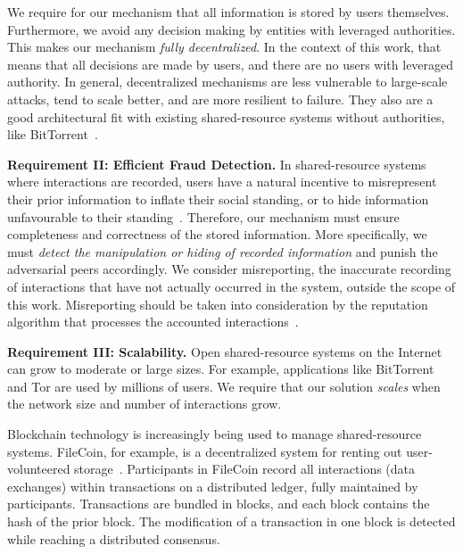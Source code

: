We require for our mechanism that all information is stored by users themselves.
Furthermore, we avoid any decision making by entities with leveraged authorities.
This makes our mechanism \emph{fully decentralized}.
In the context of this work, that means that all decisions are made by users, and there are no users with leveraged authority.
In general, decentralized mechanisms are less vulnerable to large-scale attacks, tend to scale better, and are more resilient to failure.
They also are a good architectural fit with existing shared-resource systems without authorities, like BitTorrent~\cite{cohen2008bittorrent}.

\textbf{Requirement II: Efficient Fraud Detection.}
In shared-resource systems where interactions are recorded, users have a natural incentive to misrepresent their prior information to inflate their social standing, or to hide information unfavourable to their standing~\cite{meulpolder2009bartercast}.
Therefore, our mechanism must ensure completeness and correctness of the stored information.
More specifically, we must \emph{detect the manipulation or hiding of recorded information} and punish the adversarial peers accordingly.
We consider misreporting, the inaccurate recording of interactions that have not actually occurred in the system, outside the scope of this work.
Misreporting should be taken into consideration by the reputation algorithm that processes the accounted interactions~\cite{seuken2010accounting}.


\textbf{Requirement III: Scalability.}
Open shared-resource systems on the Internet can grow to moderate or large sizes.
For example, applications like BitTorrent and Tor are used by millions of users.
We require that our solution \emph{scales} when the network size and number of interactions grow.

Blockchain technology is increasingly being used to manage shared-resource systems.
FileCoin, for example, is a decentralized system for renting out user-volunteered storage~\cite{benet2018filecoin}.
Participants in FileCoin record all interactions (data exchanges) within transactions on a distributed ledger, fully maintained by participants.
Transactions are bundled in blocks, and each block contains the hash of the prior block.
The modification of a transaction in one block is detected while reaching a distributed consensus.

